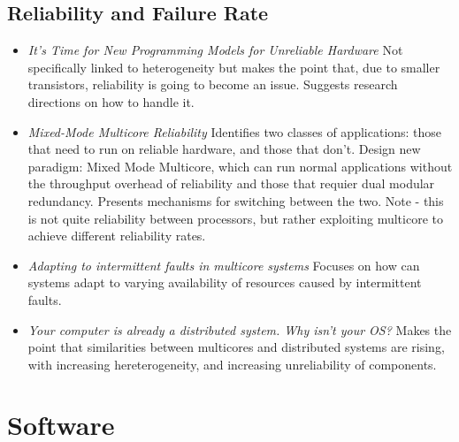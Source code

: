 \subsection{Reliability and Failure Rate}
\begin{itemize}
\item \emph{It's Time for New Programming Models for Unreliable Hardware }
Not specifically linked to heterogeneity but makes the point that, due
to smaller transistors, reliability is going to become an issue. Suggests
research directions on how to handle it. \cite{FSC}
\item \emph{Mixed-Mode Multicore Reliability} Identifies two classes
of applications: those that need to run on reliable hardware, and those
 that don't. Design new paradigm: Mixed Mode Multicore, which can
run normal applications without the throughput overhead of reliability
and those that requier dual modular redundancy. Presents mechanisms
for switching between the two. Note - this is not quite
reliability between processors, but rather exploiting multicore
to achieve different reliability rates. \cite{WCS:09}
\item \emph{Adapting to intermittent faults in multicore systems}
Focuses on how can systems adapt to varying availability of resources
caused by intermittent faults. \cite{WCS:08}
\item \emph{Your computer is already a distributed system. Why isn't your OS?} \cite{baumann2009your}
Makes the point that similarities between multicores and distributed systems are 
rising, with increasing hereterogeneity, and increasing unreliability of components.
\end{itemize}

\section{Software}

